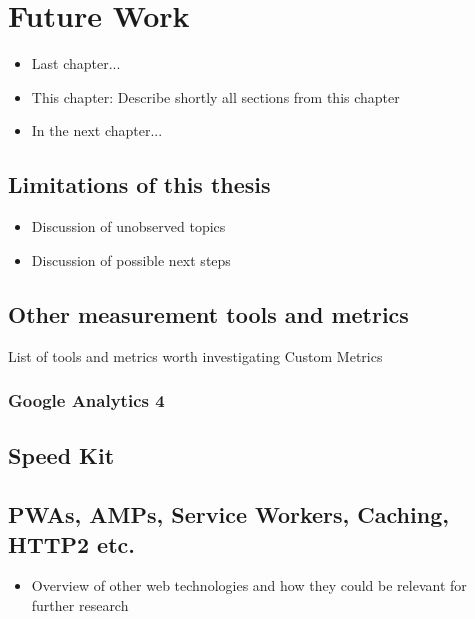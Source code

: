 \chapter{Future Work}

\begin{itemize}
	\item Last chapter...
	\item This chapter: Describe shortly all sections from this chapter
	\item In the next chapter...
\end{itemize}

\section{Limitations of this thesis}

\begin{itemize}
\item Discussion of unobserved topics
\item Discussion of possible next steps
\end{itemize}

\section{Other measurement tools and metrics}


List of tools and metrics worth investigating
Custom Metrics


\subsection{Google Analytics 4}


\section{Speed Kit}



\section{PWAs, AMPs, Service Workers, Caching, HTTP2 etc.}

\begin{itemize}
\item Overview of other web technologies and how they could be relevant for further research
\end{itemize}



